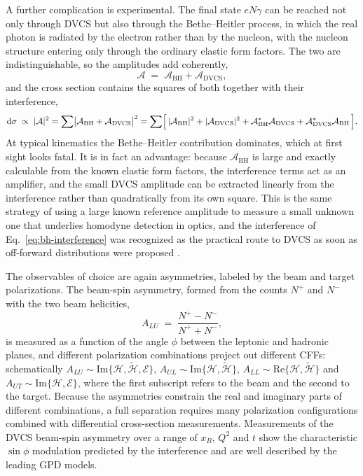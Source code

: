 A further complication is experimental. The final state $eN\gamma$ can be reached not
only through DVCS but also through the Bethe--Heitler process, in which the real photon is
radiated by the electron rather than by the nucleon, with the nucleon structure entering
only through the ordinary elastic form factors. The two are indistinguishable, so the
amplitudes add coherently,
\begin{equation}
    \mathcal{A} \;=\; \mathcal{A}_{\mathrm{BH}} + \mathcal{A}_{\mathrm{DVCS}},
    \label{eq:bh-dvcs-amplitude}
\end{equation}
and the cross section contains the squares of both together with their interference,
\begin{equation}
    \mathrm{d}\sigma \;\propto\; |\mathcal{A}|^{2}
    = \sum\bigl|\mathcal{A}_{\mathrm{BH}} + \mathcal{A}_{\mathrm{DVCS}}\bigr|^{2}
    = \sum \Bigl[\,|\mathcal{A}_{\mathrm{BH}}|^{2} + |\mathcal{A}_{\mathrm{DVCS}}|^{2}
      + \mathcal{A}_{\mathrm{BH}}^{*}\mathcal{A}_{\mathrm{DVCS}}
      + \mathcal{A}_{\mathrm{DVCS}}^{*}\mathcal{A}_{\mathrm{BH}}\,\Bigr].
    \label{eq:bh-interference}
\end{equation}
At typical kinematics the Bethe--Heitler contribution dominates, which at first sight
looks fatal. It is in fact an advantage: because $\mathcal{A}_{\mathrm{BH}}$ is large and
exactly calculable from the known elastic form factors, the interference terms act as an
amplifier, and the small DVCS amplitude can be extracted linearly from the interference
rather than quadratically from its own square. This is the same strategy of using a large
known reference amplitude to measure a small unknown one that underlies homodyne
detection in optics, and the interference of Eq.~\eqref{eq:bh-interference} was
recognized as the practical route to DVCS as soon as off-forward distributions were
proposed \cite[Ch.~4.8]{ThomasWeise2001}.

The observables of choice are again asymmetries, labeled by the beam and target
polarizations. The beam-spin asymmetry, formed from the counts $N^{+}$ and $N^{-}$ with
the two beam helicities,
\begin{equation}
    A_{LU} \;=\; \frac{N^{+} - N^{-}}{N^{+} + N^{-}},
    \label{eq:beam-spin-asymmetry}
\end{equation}
is measured as a function of the angle $\phi$ between the leptonic and hadronic planes,
and different polarization combinations project out different CFFs: schematically
$A_{LU}\sim\mathrm{Im}\{\mathcal{H},\widetilde{\mathcal{H}},\mathcal{E}\}$,
$A_{UL}\sim\mathrm{Im}\{\mathcal{H},\widetilde{\mathcal{H}}\}$,
$A_{LL}\sim\mathrm{Re}\{\mathcal{H},\widetilde{\mathcal{H}}\}$ and
$A_{UT}\sim\mathrm{Im}\{\mathcal{H},\mathcal{E}\}$, where the first subscript refers to
the beam and the second to the target. Because the asymmetries constrain the real and
imaginary parts of different combinations, a full separation requires many polarization
configurations combined with differential cross-section measurements. Measurements of the
DVCS beam-spin asymmetry over a range of $x_{B}$, $Q^{2}$ and $t$ show the characteristic
$\sin\phi$ modulation predicted by the interference and are well described by the leading
GPD models.

